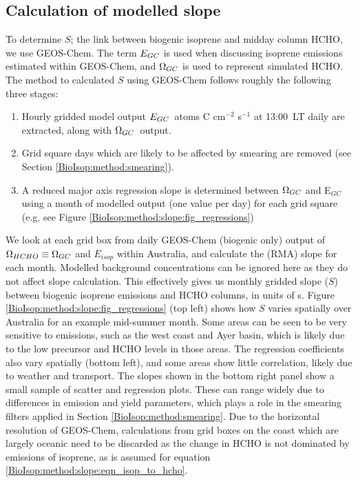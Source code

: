     
  \subsection{Calculation of modelled slope}
    \label{BioIsop:method:slope_calc}
    
    To determine $S$; the link between biogenic isoprene and midday column HCHO, we use GEOS-Chem.
    The term $E_{GC}$ is used when discussing isoprene emissions estimated within GEOS-Chem, and $\Omega_{GC}$ is used to represent simulated HCHO.
    The method to calculated $S$ using GEOS-Chem follows roughly the following three stages: 
    \begin{enumerate}
      \item 
      Hourly gridded model output $E_{GC}$~atoms C cm$^{-2}$ s$^{-1}$ at 13:00~LT daily are extracted, along with $\Omega_{GC}$~\moleccm output.
      \item
      Grid square days which are likely to be affected by smearing are removed (see Section \ref{BioIsop:method:smearing}).
      \item 
      A reduced major axis regression slope is determined between $\Omega_{GC}$ and E$_{GC}$ using a month of modelled output (one value per day) for each grid square (e.g. see Figure \ref{BioIsop:method:slope:fig_regressions})
    \end{enumerate}
    
    We look at each \lowhr grid box from daily GEOS-Chem (biogenic only) output of $\Omega_{HCHO} \equiv \Omega_{GC}$ and $E_{isop}$ within Australia, and calculate the (RMA) slope for each month.
    Modelled background concentrations can be ignored here as they do not affect slope calculation.
    This effectively gives us monthly gridded slope ($S$) between biogenic isoprene emissions and HCHO columns, in units of s.
    Figure \ref{BioIsop:method:slope:fig_regressions} (top left) shows how $S$ varies spatially over Australia for an example mid-summer month. Some areas can be seen to be very sensitive to emissions, such as the west coast and Ayer basin, which is likely due to the low precursor and HCHO levels in those areas.
    The regression coefficients also vary spatially (bottom left), and some areas show little correlation, likely due to weather and transport.
    The slopes shown in the bottom right panel show a small sample of scatter and regression plots. 
    These can range widely due to differences in emission and yield parameters, which plays a role in the smearing filters applied in Section \ref{BioIsop:method:smearing}.
    Due to the \lowhr horizontal resolution of GEOS-Chem, calculations from grid boxes on the coast which are largely oceanic need to be discarded as the change in HCHO is not dominated by emissions of isoprene, as is assumed for equation \ref{BioIsop:method:slope:eqn_isop_to_hcho}.
    
